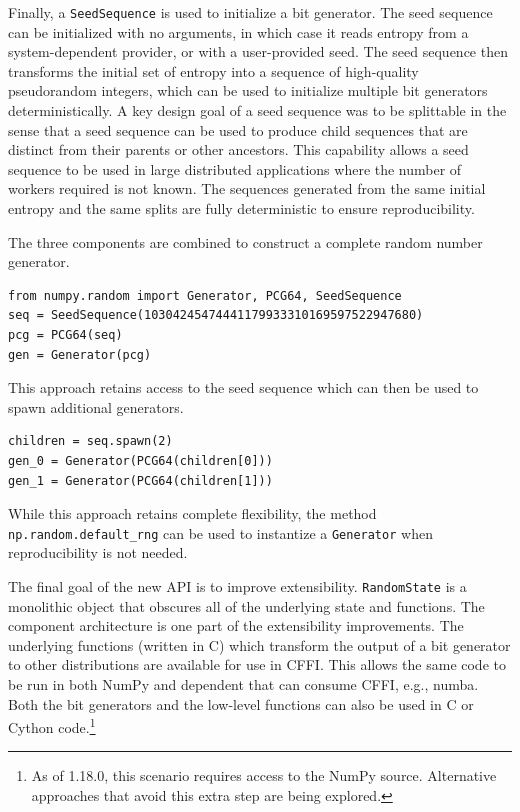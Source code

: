 \documentclass[fleqn,10pt]{wlscirep}
\newcommand{\code}[1]{\texttt{#1}}
\begin{document}
Finally, a \code{SeedSequence} is used to initialize a bit generator. The seed
sequence can be initialized with no arguments, in which case it reads entropy
from a system-dependent provider, or with a user-provided seed. The seed
sequence then transforms the initial set of entropy into a sequence of
high-quality pseudorandom integers, which can be used to initialize multiple bit
generators deterministically. A key design goal of a seed sequence was to be
splittable in the sense that a seed sequence can be used to produce child
sequences that are distinct from their parents or other ancestors. This
capability allows a seed sequence to be used in large distributed applications
where the number of workers required is not known. The sequences generated from
the same initial entropy and the same splits are fully deterministic to ensure
reproducibility.

The three components are combined to construct a complete random number
generator.

\begin{lstlisting}
from numpy.random import Generator, PCG64, SeedSequence
seq = SeedSequence(10304245474441179933310169597522947680)
pcg = PCG64(seq)
gen = Generator(pcg)
\end{lstlisting}

\noindent This approach retains access to the seed sequence which can then be
used to spawn additional generators.

\begin{lstlisting}
children = seq.spawn(2)
gen_0 = Generator(PCG64(children[0]))
gen_1 = Generator(PCG64(children[1]))
\end{lstlisting}

\noindent While this approach retains complete flexibility, the method
\code{np.random.default\_rng} can be used to instantize a \code{Generator} when
reproducibility is not needed.

The final goal of the new API is to improve extensibility. \code{RandomState} is
a monolithic object that obscures all of the underlying state and functions. The
component architecture is one part of the extensibility improvements. The
underlying functions (written in C) which transform the output of a bit
generator to other distributions are available for use in CFFI. This allows the
same code to be run in both NumPy and dependent that can consume CFFI, e.g.,
numba. Both the bit generators and the low-level functions can also be used in C
or Cython code.\footnote{As of 1.18.0, this scenario requires access to the
NumPy source. Alternative approaches that avoid this extra step are being
explored.} 
\end{document}
